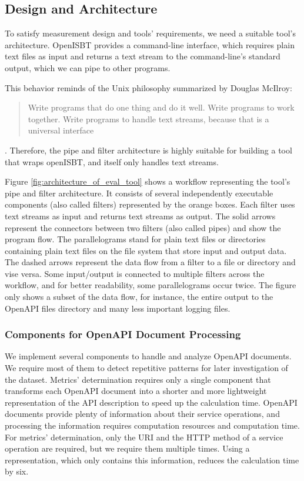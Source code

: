 \subsection{Design and Architecture}
\label{sec:eval_tool:design_and_architecture}

To satisfy measurement design and tools' requirements, we need a suitable tool's architecture. OpenISBT provides a command-line interface, which requires plain text files as input and returns a text stream to the command-line's standard output, which we can pipe to other programs. 

This behavior reminds of the Unix philosophy summarized by Douglas McIlroy: \blockquote{
Write programs that do one thing and do it well. Write programs to work together. Write programs to handle text streams, because that is a universal interface
}\cite[quoted in ][]{a_quarter_century_of_unix}. Therefore, the pipe and filter architecture is highly suitable for building a tool that wraps openISBT, and itself only handles text streams. 

Figure \ref{fig:architecture_of_eval_tool} shows a workflow representing the tool's pipe and filter architecture. It consists of several independently executable components (also called filters) represented by the orange boxes. 
Each filter uses text streams as input and returns text streams as output. The solid arrows represent the connectors between two filters (also called pipes) and show the program flow. The parallelograms stand for plain text files or directories containing plain text files on the file system that store input and output data. The dashed arrows represent the data flow from a filter to a file or directory and vise versa. Some input/output is connected to multiple filters across the workflow, and for better readability, some parallelograms occur twice. The figure only shows a subset of the data flow, for instance, the entire output to the OpenAPI files directory and many less important logging files.



\subsubsection{Components for OpenAPI Document Processing}
We implement several components to handle and analyze OpenAPI documents. We require most of them to detect repetitive patterns for later investigation of the dataset. Metrics' determination requires only a single component that transforms each OpenAPI document into a shorter and more lightweight representation of the API description to speed up the calculation time. OpenAPI documents provide plenty of information about their service operations, and processing the information requires computation resources and computation time. For metrics' determination, only the URI and the HTTP method of a service operation are required, but we require them multiple times. Using a representation, which only contains this information, reduces the calculation time by six.


